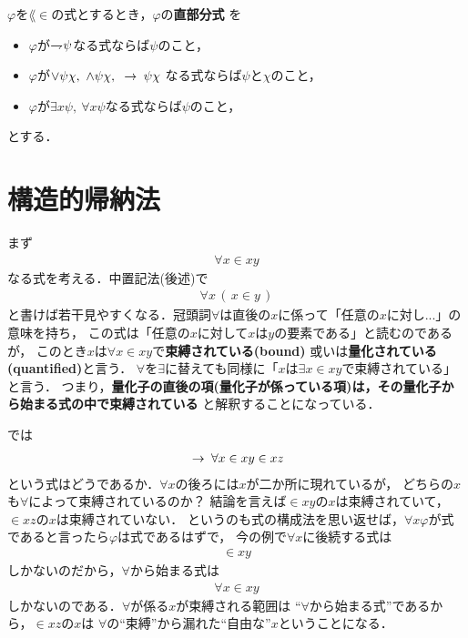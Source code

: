 	\begin{screen}
		\begin{metadfn}[直部分式]
		\label{metadfn:L_in_immediate_subformula}
			$\varphi$を$\lang{\in}$の式とするとき，$\varphi$の{\bf 直部分式}
			を
			\begin{itemize}
				\item $\varphi$が$\rightharpoondown\hspace{-0.25em} \psi$なる式ならば$\psi$のこと，
				\item $\varphi$が$\vee \psi \chi,\ \wedge \psi \chi,\ \hspace{0.25em}\rightarrow\hspace{0.25em} \psi \chi$
					なる式ならば$\psi$と$\chi$のこと，
				\item $\varphi$が$\exists x \psi,\ \forall x \psi$なる式ならば$\psi$のこと，
			\end{itemize}
			とする．
		\end{metadfn}
	\end{screen}
	
\section{構造的帰納法}
	まず
	\begin{align}
		\forall x \in x y
	\end{align}
	なる式を考える．中置記法(後述)で
	\begin{align}
		\forall x\, (\, x \in y\, )
	\end{align}
	と書けば若干見やすくなる．冠頭詞$\forall$は直後の$x$に係って「任意の$x$に対し...」の意味を持ち，
	この式は「任意の$x$に対して$x$は$y$の要素である」と読むのであるが，
	このとき$x$は$\forall x \in x y$で{\bf 束縛されている}{\bf (bound)}
	或いは{\bf 量化されている}{\bf (quantified)}と言う．
	$\forall$を$\exists$に替えても同様に「$x$は$\exists x \in x y$で束縛されている」と言う．
	つまり，{\bf 量化子の直後の項(量化子が係っている項)は，その量化子から始まる式の中で束縛されている}
	と解釈することになっている．
	
	では
	\begin{align}
		\hspace{0.25em}\rightarrow\hspace{0.25em} \forall x \in x y \in x z
	\end{align}
	という式はどうであるか．$\forall x$の後ろには$x$が二か所に現れているが，
	どちらの$x$も$\forall$によって束縛されているのか？
	結論を言えば$\in x y$の$x$は束縛されていて，$\in x z$の$x$は束縛されていない．
	というのも式の構成法を思い返せば，$\forall x \varphi$が式であると言ったら$\varphi$は式であるはずで，
	今の例で$\forall x$に後続する式は
	\begin{align}
		\in x y
	\end{align}
	しかないのだから，$\forall$から始まる式は
	\begin{align}
		\forall x \in x y
	\end{align}
	しかないのである．$\forall$が係る$x$が束縛される範囲は
	``$\forall$から始まる式''であるから，$\in x z$の$x$は
	$\forall$の``束縛''から漏れた``自由な''$x$ということになる．
	
